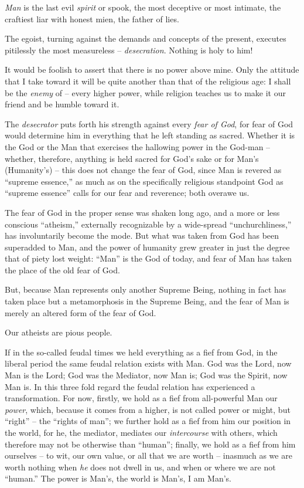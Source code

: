 \documentclass[12pt,a4paper]{book}
\begin{document}
\textit{Man} is the last evil \textit{spirit} or spook, the most deceptive or 
most intimate, the craftiest liar with honest mien, the father of lies.

The egoist, turning against the demands and concepts of the present, executes 
pitilessly the most measureless -- \textit{desecration}. Nothing is holy to 
him!

It would be foolish to assert that there is no power above mine. Only the 
attitude that I take toward it will be quite another than that of the 
religious age: I shall be the \textit{enemy} of -- every higher power, while 
religion teaches us to make it our friend and be humble toward it.

The \textit{desecrator} puts forth his strength against every \textit{fear of 
God}, for fear of God would determine him in everything that he left standing 
as sacred. Whether it is the God or the Man that exercises the hallowing power 
in the God-man -- whether, therefore, anything is held sacred for God's sake 
or for Man's (Humanity's) -- this does not change the fear of God, since Man 
is revered as ``supreme essence,'' as much as on the specifically religious 
standpoint God as ``supreme essence'' calls for our fear and reverence; both 
overawe us.

The fear of God in the proper sense was shaken long ago, and a more or less 
conscious ``atheism,'' externally recognizable by a wide-spread 
``unchurchliness,'' has involuntarily become the mode. But what was taken 
from God has been superadded to Man, and the power of humanity grew greater in 
just the degree that of piety lost weight: ``Man'' is the God of today, and 
fear of Man has taken the place of the old fear of God.

But, because Man represents only another Supreme Being, nothing in fact has 
taken place but a metamorphosis in the Supreme Being, and the fear of Man is 
merely an altered form of the fear of God.

Our atheists are pious people.

If in the so-called feudal times we held everything as a fief from God, in the 
liberal period the same feudal relation exists with Man. God was the Lord, now 
Man is the Lord; God was the Mediator, now Man is; God was the Spirit, now Man 
is. In this three fold regard the feudal relation has experienced a 
transformation. For now, firstly, we hold as a fief from all-powerful Man our 
\textit{power}, which, because it comes from a higher, is not called power or 
might, but ``right'' -- the ``rights of man''; we further hold as a fief 
from him our position in the world, for he, the mediator, mediates our 
\textit{intercourse} with others, which therefore may not be otherwise than 
``human''; finally, we hold as a fief from him ourselves -- to wit, our own 
value, or all that we are worth -- inasmuch as we are worth nothing when 
\textit{he} does not dwell in us, and when or where we are not ``human.'' 
The power is Man's, the world is Man's, I am Man's.
\end{document}
